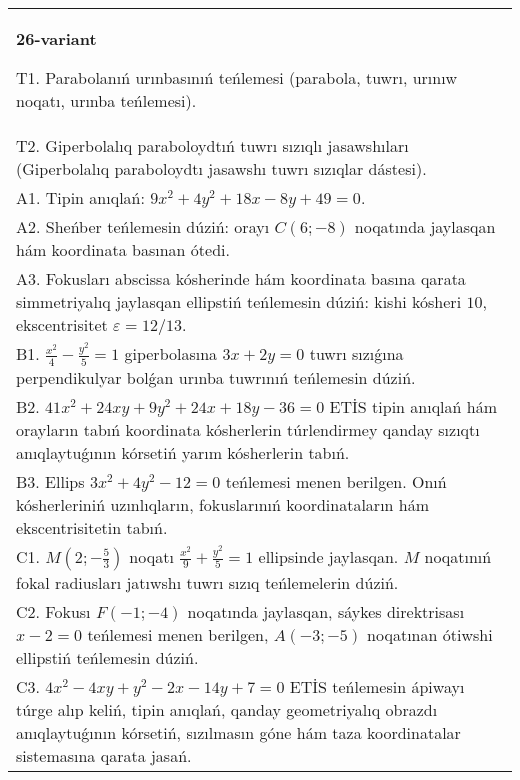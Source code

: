 \documentclass{article}
\begin{document}
\begin{tabular}{m{17cm}}
\textbf{26-variant}
\newline

T1. Parabolanıń urınbasınıń teńlemesi (parabola, tuwrı, urınıw noqatı, urınba teńlemesi).\\

T2. Giperbolalıq paraboloydtıń tuwrı sızıqlı jasawshıları (Giperbolalıq paraboloydtı jasawshı tuwrı sızıqlar dástesi).\\

A1. Tipin anıqlań: $9 x^{2}+4 y^{2}+18 x-8 y+49=0$.\\

A2. Sheńber teńlemesin dúziń: orayı $C (6 ;-8) $ noqatında jaylasqan hám koordinata basınan ótedi.\\

A3. Fokusları abscissa kósherinde hám koordinata basına qarata simmetriyalıq jaylasqan ellipstiń teńlemesin dúziń: kishi kósheri $10$, ekscentrisitet $\varepsilon=12/13$.\\

B1. $\frac{x^{2}}{4} - \frac{y^{2}}{5} = 1$ giperbolasına $3x + 2y = 0$ tuwrı sızıǵına perpendikulyar bolǵan urınba tuwrınıń teńlemesin dúziń.\\

B2. $41x^{2} + 24xy + 9y^{2} + 24x + 18y - 36 = 0$ ETİS tipin anıqlań hám orayların tabıń koordinata kósherlerin túrlendirmey qanday sızıqtı anıqlaytuǵının kórsetiń yarım kósherlerin tabıń.  \\

B3. Ellips $3x^{2} + 4y^{2} - 12 = 0$ teńlemesi menen berilgen. Onıń kósherleriniń uzınlıqların, fokuslarınıń koordinataların hám ekscentrisitetin tabıń.  \\

C1. $M(2; - \frac{5}{3})$ noqatı $\frac{x^{2}}{9} + \frac{y^{2}}{5} = 1$ ellipsinde jaylasqan. $M$ noqatınıń fokal radiusları jatıwshı tuwrı sızıq teńlemelerin dúziń.  \\

C2. Fokusı $F( - 1; - 4)$ noqatında jaylasqan, sáykes direktrisası $x - 2 = 0$ teńlemesi menen berilgen, $A( - 3; - 5)$ noqatınan ótiwshi ellipstiń teńlemesin dúziń.  \\

C3. $4x^{2} - 4xy + y^{2} - 2x - 14y + 7 = 0$ ETİS teńlemesin ápiwayı túrge alıp keliń, tipin anıqlań, qanday geometriyalıq obrazdı anıqlaytuǵının kórsetiń, sızılmasın góne hám taza koordinatalar sistemasına qarata jasań.  \\

\end{tabular}
\vspace{1cm}
\end{document}
